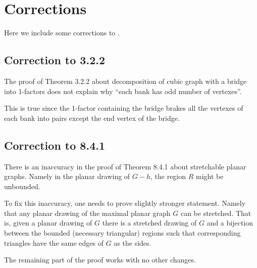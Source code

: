 \chapter{Corrections}

Here we include some corrections to \cite{pearls}.

\section*{Correction to 3.2.2}

The proof of Theorem 3.2.2 about decomposition of cubic graph with a bridge into 1-factors
does not explain why ``each bank has odd number of vertexes''.

This is true since the 1-factor containing the bridge brakes all the vertexes of each bank into pairs except the end vertex of the bridge.


\section*{Correction to 8.4.1}

There is an inaccuracy in the proof of Theorem 8.4.1 about stretchable planar graphs.
Namely in the planar drawing of $G-h$, the region $R$ might be unbounded.

To fix this inaccuracy, one needs to prove slightly stronger statement.
Namely that any planar drawing of the maximal planar graph $G$ can be stretched.
That is, given a planar drawing of $G$ there is a stretched drawing of $G$ 
and a bijection between the bounded (necessary triangular) regions such that corresponding triangles have the same edges of $G$ as the sides.

The remaining part of the proof works with no other changes.
